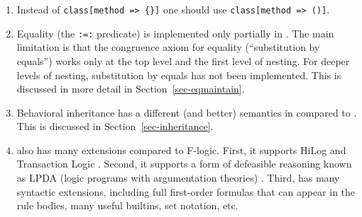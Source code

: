 \documentclass[11pt]{article}
\newcommand{\ERGO}{\mbox{\smaller{\ensuremath{\cal{E}}\smaller{{\sc{RGO}}}}}\xspace}
\newcommand{\FLSYSTEM}{\ERGO}
\begin{document}
\begin{enumerate}
  The semantics of this new type of formulas can be
  characterized by the following logical entailments ($\phi \models \psi$
  means $\phi$ logically entails $\psi$):
  \begin{quote}
    {\tt X[|M => T|], Y::X $\models$ Y[|M => T|]}\\
    {\tt X[|M => T|], Y:X $\models$ Y[M => T]}
  \end{quote}
\item Instead of {\tt class[method => \{\}]}
  one should use {\tt class[method => ()]}.
\item Equality (the {\tt :=:} predicate) is implemented only partially in
  \FLSYSTEM. The main limitation is that the congruence axiom for equality
  (``substitution by equals'') works only at the top level and the first
  level of nesting.  For deeper levels of nesting, substitution by equals
  has not been implemented. This is discussed in more detail in
  Section~\ref{sec-eqmaintain}.
\item Behavioral inheritance has a different (and better) semantics in
  \FLSYSTEM compared to \cite{KLW95}.
  This is discussed in Section~\ref{sec-inheritance}.
\item \FLSYSTEM also has many extensions compared to F-logic. First, it
  supports HiLog \cite{hilog-jlp,hilog-icdt-95} and Transaction Logic
  \cite{trans-iclp93,trans-tcs94,trans-chapter-98}.
  Second, it supports a form of defeasible reasoning known as LPDA (logic
  programs with argumentation theories) \cite{lpda-iclp-09}. Third,
  \FLSYSTEM has many syntactic extensions, including full first-order
  formulas that can appear in the rule bodies, many useful builtins, set
  notation, etc.
\end{enumerate}

\newpage



\printindex
\end{document}
